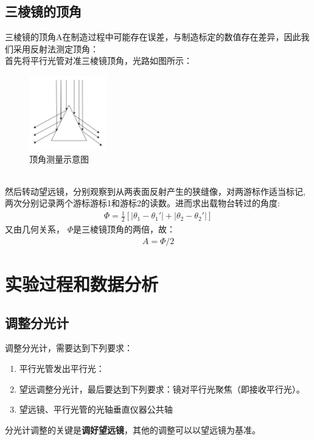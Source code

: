 \documentclass[UTF8]{ctexart}
\begin{document}
\subsection{三棱镜的顶角}
三棱镜的顶角A在制造过程中可能存在误差，与制造标定的数值存在差异，因此我们采用反射法测定顶角：\\
首先将平行光管对准三棱镜顶角，光路如图所示：
\begin{figure}[h]
    \centering
    \includegraphics[width=0.3\textwidth]{A.png}
    \caption{顶角测量示意图}
    \label{fig:A}
\end{figure}
\\
然后转动望远镜，分别观察到从两表面反射产生的狭缝像，对两游标作适当标记,两次分别记录两个游标游标1和游标2的读数。进而求出载物台转过的角度:\\
\begin{align}
    \Phi=\frac{1}{2}[|\theta_1-\theta_1'|+|\theta_2-\theta_2'|]
\end{align}
又由几何关系， $\Phi$是三棱镜顶角的两倍，故：
\begin{align}
    A=\Phi/2
\end{align}

\section{实验过程和数据分析}
\subsection{调整分光计}
调整分光计，需要达到下列要求：
\begin{enumerate}
    \item 平行光管发出平行光：
    \item 望远调整分光计，最后要达到下列要求：镜对平行光聚焦（即接收平行光）。
    \item 望远镜、平行光管的光轴垂直仪器公共轴
\end{enumerate}
分光计调整的关键是\textbf{调好望远镜}，其他的调整可以以望远镜为基准。
\end{document}
